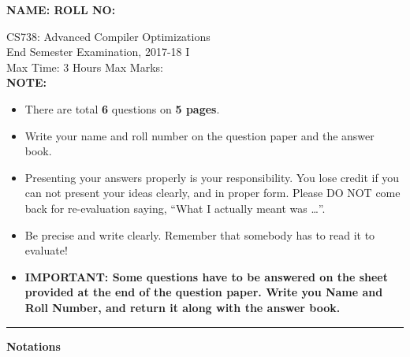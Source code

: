 \documentclass[12pt]{article}
\newcommand{\tbd}[1]{{\red #1}}
\begin{document}
{\Large\bf NAME: \hspace*{3in} ROLL NO:}

\begin{center}
CS738: Advanced Compiler Optimizations \\
End Semester Examination, 2017-18 I\\
Max Time: 3 Hours  \hfill Max Marks: \tbd{160} \\

{\bf NOTE: }
\begin{itemize}
\item There are total {\bf 6} questions on {\bf 5 pages}.
\item Write your name and roll number on the question paper and the
  answer book.
\item Presenting your answers properly is your
  responsibility. You lose credit if you can not present your
  ideas clearly, and in proper form. Please DO NOT come back
  for re-evaluation saying, ``What I actually meant was
  \ldots''.
\item Be precise and write clearly. Remember that somebody
  has to read it to evaluate!
\item {\bf IMPORTANT: Some questions have to be answered on the
  sheet provided at the end of the question paper. Write you Name
  and Roll Number, and return it along with the answer book.}

\end{itemize}
\hrule
\end{center}


\newcommand{\pt}{\ensuremath{\pi}}
\newcommand{\fgentry}{{\sf Entry}}
\newcommand{\fgexit}{{\sf Exit}}
\begin{center}
  \Large\bf Notations
\end{center}
\newcommand{\indef}[2]{\ensuremath{{\sf BeforeIN}(#1, #2)}}
\newcommand{\outdef}[2]{\ensuremath{{\sf BeforeOut}(#1, #2)}}
\newcommand{\inuse}[2]{\ensuremath{{\sf AfterIN}(#1, #2)}}
\newcommand{\outuse}[2]{\ensuremath{{\sf AfterOut}(#1, #2)}}
\newcommand{\inacc}[2]{\ensuremath{{\sf AccIN}(#1, #2)}}
\newcommand{\outacc}[2]{\ensuremath{{\sf AccOUT}(#1, #2)}}
\newcommand{\inaccset}[2]{\ensuremath{{\sf AccSetIN}(#1, #2)}}
\newcommand{\outaccset}[2]{\ensuremath{{\sf AccSetOUT}(#1, #2)}}
\newcommand{\IN}[1]{\ensuremath{{\sf IN}(#1)}}
\newcommand{\OUT}[1]{\ensuremath{{\sf OUT}(#1)}}
\newcommand{\Pred}[1]{\ensuremath{{\sf PRED}(#1)}}
\newcommand{\Succ}[1]{\ensuremath{{\sf SUCC}(#1)}}
\newcommand{\cpath}{\ensuremath{\stackrel{+}{\longrightarrow}}}
\newcommand{\idfp}{\ensuremath{\mbox{DF}^+}}
\end{document}
